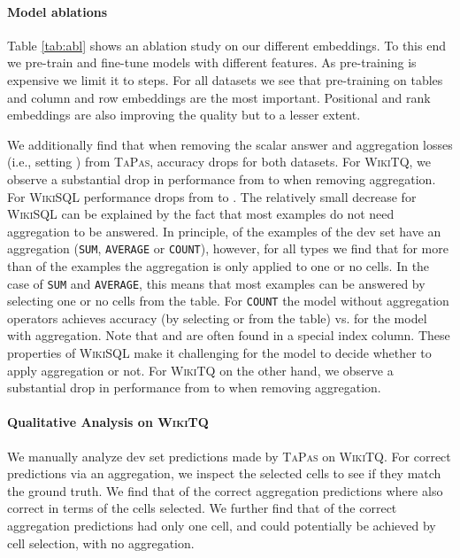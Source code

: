 \documentclass[11pt,a4paper]{article}
\newcommand\wikisql{\textsc{WikiSQL}\xspace}
\newcommand\wtq{\textsc{WikiTQ}\xspace}
\newcommand{\ours}{\textsc{TaPas}\xspace}
\begin{document}
\paragraph{Model ablations} 

Table \ref{tab:abl} shows an ablation study on our different embeddings.
To this end we pre-train and fine-tune models with different features.
As pre-training is expensive we limit it to  steps.
For all datasets we see that pre-training on tables and column and row embeddings are the most important.
Positional and rank embeddings are also improving the quality but to a lesser extent.

We additionally find that when removing the scalar answer and aggregation losses (i.e., setting ) from \ours, accuracy drops for both datasets. For \wtq, we observe a substantial drop in performance from  to  when removing aggregation. For \wikisql{} performance drops from  to .
The relatively small decrease for \wikisql{} can be explained by the fact that most examples do not need aggregation to be answered.
In principle,  of the examples of the dev set have an aggregation (\texttt{SUM}, \texttt{AVERAGE} or \texttt{COUNT}), however, 
for all types we find that for more than  of the examples the aggregation is only applied to one or no cells.
In the case of \texttt{SUM} and \texttt{AVERAGE}, this means that most examples can be answered by selecting one or no cells from the table.
For \texttt{COUNT} the model without aggregation operators achieves  accuracy (by selecting  or  from the table) vs.  for the model with aggregation.
Note that  and  are often found in a special index column. 
These properties of \wikisql{} make it challenging for the model to decide whether to apply aggregation or not.
For \wtq on the other hand, we observe a substantial drop in performance from  to  when removing aggregation.

\paragraph{Qualitative Analysis on \wtq}
\label{sec:error_analysis}

We manually analyze  dev set predictions made by \ours on \wtq. For correct predictions via an aggregation, we inspect the selected cells to see if they match the ground truth. We find that  of the correct aggregation predictions where also correct in terms of the cells selected. We further find that  of the correct aggregation predictions had only one cell, and could potentially be achieved by cell selection, with no aggregation.
\end{document}
